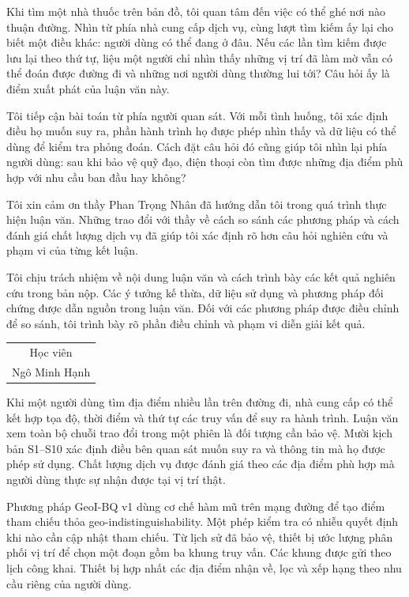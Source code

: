 \hypersetup{pageanchor=false}

\frontmatter
\hypersetup{pageanchor=true}
Khi tìm một nhà thuốc trên bản đồ, tôi quan tâm đến việc có thể ghé nơi nào thuận đường.
Nhìn từ phía nhà cung cấp dịch vụ, cùng lượt tìm kiếm ấy lại cho biết một điều khác:
người dùng có thể đang ở đâu. Nếu các lần tìm kiếm được lưu lại theo thứ tự, liệu một
người chỉ nhìn thấy những vị trí đã làm mờ vẫn có thể đoán được đường đi và những nơi
người dùng thường lui tới? Câu hỏi ấy là điểm xuất phát của luận văn này.

Tôi tiếp cận bài toán từ phía người quan sát. Với mỗi tình huống, tôi xác định điều họ
muốn suy ra, phần hành trình họ được phép nhìn thấy và dữ liệu có thể dùng để kiểm tra
phỏng đoán. Cách đặt câu hỏi đó cũng giúp tôi nhìn lại phía người dùng: sau khi bảo vệ
quỹ đạo, điện thoại còn tìm được những địa điểm phù hợp với nhu cầu ban đầu hay không?

Tôi xin cảm ơn thầy Phan Trọng Nhân đã hướng dẫn tôi trong quá trình thực hiện luận văn.
Những trao đổi với thầy về cách so sánh các phương pháp và cách đánh giá chất lượng
dịch vụ đã giúp tôi xác định rõ hơn câu hỏi nghiên cứu và phạm vi của từng kết luận.

Tôi chịu trách nhiệm về nội dung luận văn và cách trình bày các kết quả nghiên cứu
trong bản nộp. Các ý tưởng kế thừa, dữ liệu sử dụng và phương pháp đối chứng được
dẫn nguồn trong luận văn. Đối với các phương pháp được điều chỉnh để so sánh, tôi
trình bày rõ phần điều chỉnh và phạm vi diễn giải kết quả.
\par\vspace{1.5cm}
\hfill\begin{tabular}{c}Học viên\\[1.6cm]Ngô Minh Hạnh\end{tabular}

Khi một người dùng tìm địa điểm nhiều lần trên đường đi, nhà cung cấp có thể kết hợp tọa độ,
thời điểm và thứ tự các truy vấn để suy ra hành trình. Luận văn xem toàn bộ chuỗi trao đổi
trong một phiên là đối tượng cần bảo vệ. Mười kịch bản S1--S10 xác định điều bên quan sát
muốn suy ra và thông tin mà họ được phép sử dụng. Chất lượng dịch vụ được đánh giá theo các
địa điểm phù hợp mà người dùng thực sự nhận được tại vị trí thật.

Phương pháp GeoI-BQ v1 dùng cơ chế hàm mũ trên mạng đường để tạo điểm tham chiếu thỏa
geo-indistinguishability. Một phép kiểm tra có nhiễu quyết định khi nào cần cập nhật tham
chiếu. Từ lịch sử đã bảo vệ, thiết bị ước lượng phân phối vị trí để chọn một đoạn gồm ba
khung truy vấn. Các khung được gửi theo lịch công khai. Thiết bị hợp nhất các địa điểm
nhận về, lọc và xếp hạng theo nhu cầu riêng của người dùng.

